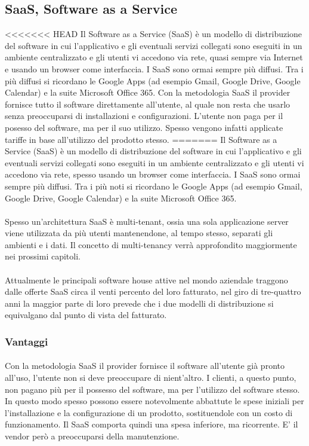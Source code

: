 \subsection{SaaS, Software as a Service}
<<<<<<< HEAD
Il Software as a Service (SaaS) è un modello di distribuzione del software in cui l’applicativo e gli eventuali servizi collegati sono eseguiti in un ambiente centralizzato e gli utenti vi accedono via rete, quasi sempre via Internet e usando un browser come interfaccia. I SaaS sono ormai sempre più diffusi. Tra i più diffusi si ricordano le Google Apps (ad esempio Gmail, Google Drive, Google Calendar) e la suite Microsoft Office 365. Con la metodologia SaaS il provider fornisce tutto il software direttamente all'utente, al quale non resta che usarlo senza preoccuparsi di installazioni e configurazioni. L'utente non paga per il posesso del software, ma per il suo utilizzo. Spesso vengono infatti applicate tariffe in base all'utilizzo del prodotto stesso. 
=======
Il Software as a Service (SaaS) è un modello di distribuzione del software in cui l’applicativo e gli eventuali servizi collegati sono eseguiti in un ambiente centralizzato e gli utenti vi accedono via rete, spesso usando un browser come interfaccia. I SaaS sono ormai sempre più diffusi. Tra i più noti si ricordano le Google Apps (ad esempio Gmail, Google Drive, Google Calendar) e la suite Microsoft Office 365. 
\paragraph{}
Spesso un'architettura SaaS è multi-tenant, ossia una sola applicazione server viene utilizzata da più utenti mantenendone, al tempo stesso, separati gli ambienti e i dati. Il concetto di multi-tenancy verrà approfondito maggiormente nei prossimi capitoli.
\paragraph{}
Attualmente le principali software house attive nel mondo aziendale traggono dalle offerte SaaS circa il venti percento del loro fatturato, nel giro di tre-quattro anni la maggior parte di loro prevede che i due modelli di distribuzione si equivalgano dal punto di vista del fatturato.
\subsubsection{Vantaggi}
\paragraph{}
Con la metodologia SaaS il provider fornisce il software all'utente già pronto all'uso, l'utente non si deve preoccupare di nient'altro. I clienti, a questo punto, non pagano più per il possesso del software, ma per l'utilizzo del software stesso. In questo modo spesso possono essere notevolmente abbattute le spese iniziali per l'installazione e la configurazione di un prodotto, sostituendole con un costo di funzionamento. Il SaaS comporta quindi una spesa inferiore, ma ricorrente. E' il vendor però a preoccuparsi della manutenzione.
